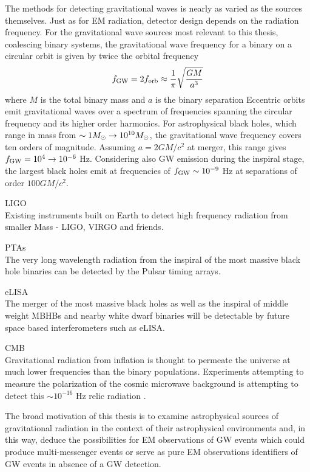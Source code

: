 The methods for detecting gravitational waves is nearly as varied as the sources themselves. Just as for EM radiation, detector design depends on the radiation frequency. For the gravitational wave sources most relevant to this thesis, coalescing binary systems, the gravitational wave frequency for a binary on a circular orbit is given by twice the orbital frequency
\begin{equation}
f_{\rm{GW}} = 2 f_{\rm{orb}} \approx  \frac{1}{\pi} \sqrt{\frac{G M }{a^3}}
\end{equation}
where $M$ is the total binary mass and $a$ is the binary separation Eccentric orbits emit gravitational waves over a spectrum of frequencies spanning the circular frequency and its higher order harmonics. For astrophysical black holes, which range in mass from $\sim 1 {M_{\odot}} \rightarrow 10^{10} {M_{\odot}}$, the gravitational wave frequency covers ten orders of magnitude. Assuming $a = 2GM/c^2$ at merger, this range gives $f_{\rm{GW}} = 10^4 \rightarrow 10^{-6}$ Hz. Considering also GW emission during the inspiral stage, the largest black holes emit at frequencies of $f_{\rm{GW}} \sim 10^{-9}$ Hz at separations of order $100 GM/c^2$.

LIGO\\
Existing instruments built on Earth to detect high frequency radiation from smaller Mass - LIGO, VIRGO and friends.

PTAs\\
The very long wavelength radiation from the inspiral of the most massive black hole binaries can be detected by the Pulsar timing arrays.

eLISA\\
The merger of the most massive black holes as well as the inspiral of middle weight MBHBs and nearby white dwarf binaries will be detectable by future space based interferometers such as eLISA.

CMB\\
Gravitational radiation from inflation is thought to permeate the universe at much lower frequencies than the binary populations. Experiments attempting to measure the polarization of the cosmic microwave background is attempting to detect this $\sim 10^{-16}$ Hz relic radiation \citep{}.













The broad motivation of this thesis is to examine astrophysical sources of gravitational radiation in the context of their astrophysical environments and, in this way, deduce the possibilities for EM observations of GW events which could produce multi-messenger events or serve as pure EM observations identifiers of GW events in absence of a GW detection.


